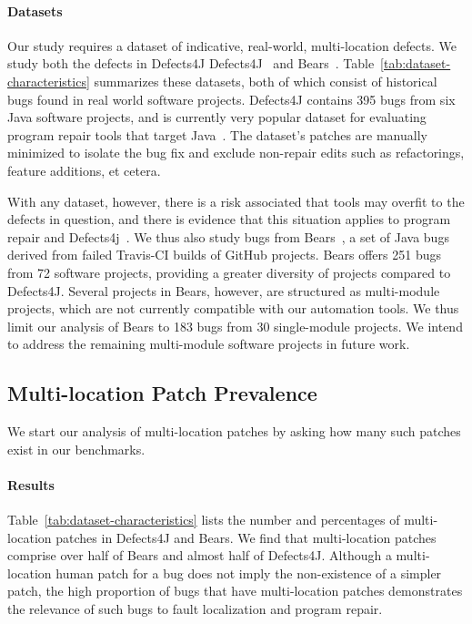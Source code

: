 \documentclass[sigconf, timestamp-false, anonymous=true]{acmart}
\begin{document}
\paragraph{Datasets}  Our study requires a dataset of indicative, real-world,
multi-location defects.  We study both the defects in Defects4J
Defects4J~\cite{defects4j} and Bears~\cite{bears}.  Table~\ref{tab:dataset-characteristics}
summarizes these datasets, both of which
consist of historical
bugs found in real world software projects. Defects4J contains 395 bugs from 
six Java software projects, and is currently very popular dataset for evaluating 
program repair tools that target Java~\cite{durieux-repair-them-all}.
The dataset's patches are manually minimized to isolate the bug fix 
and exclude non-repair edits such as refactorings, feature additions, et cetera.

With any dataset, however, there is a risk associated that tools may overfit
to the defects in question, and there is evidence that this situation applies to
program repair and Defects4j~\cite{durieux-repair-them-all}. 
We thus also study bugs from Bears~\cite{bears}, 
a set of Java bugs derived from failed Travis-CI builds of GitHub projects. 
Bears offers 251 bugs from 72 software projects, providing a greater diversity of 
projects compared to Defects4J. 
Several projects in Bears, however, are structured as multi-module projects, 
which are not currently compatible with our automation tools.
We thus limit our analysis of Bears to 183 bugs from 30 single-module projects.
We intend to address the remaining multi-module software projects in future work.

\subsection{Multi-location Patch Prevalence}

We start our analysis of multi-location patches by asking how many such patches 
exist in our benchmarks.

\paragraph{Results} 
Table~\ref{tab:dataset-characteristics} lists the number and percentages of
multi-location patches in Defects4J and Bears. 
We find that multi-location patches comprise over half of Bears and almost half of Defects4J.
Although a multi-location human patch for a bug does not imply the 
non-existence of a simpler patch, the high proportion of bugs that have 
multi-location patches demonstrates the relevance of such bugs to fault localization and
program repair. 
\end{document}
